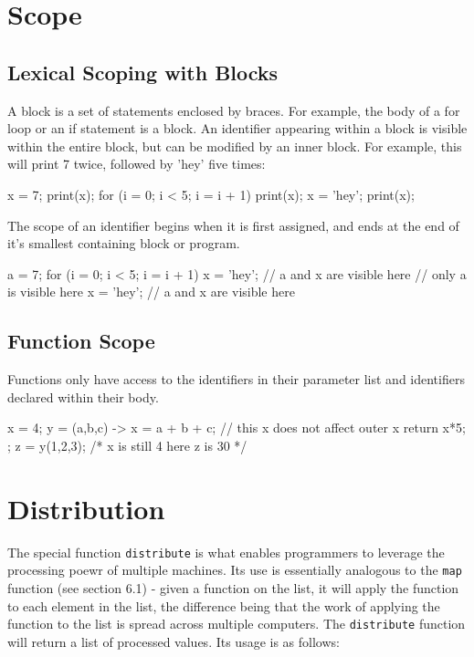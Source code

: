 \documentclass[oneside]{book}
\begin{document}
\section{Scope}

\subsection{Lexical Scoping with Blocks}

A block is a set of statements enclosed by braces. For example, the body of a for loop or an if statement is a block. An identifier appearing within a block is visible within the entire block, but can be modified by an inner block. For example, this will print 7 twice, followed by 'hey' five times:
\begin{mdframed}[hidealllines=true,backgroundcolor=gray!10,skipbelow=.5em,skipabove=.5em]
\begin{code}
x = 7;
print(x);
for (i = 0; i < 5; i = i + 1)
{
  print(x);
  x = 'hey';
}
print(x);
\end{code}
\end{mdframed}
The scope of an identifier begins when it is first assigned, and ends at the end of it's smallest containing block or program.
\begin{mdframed}[hidealllines=true,backgroundcolor=gray!10,skipbelow=.5em,skipabove=.5em]
\begin{code}
a = 7;
for (i = 0; i < 5; i = i + 1)
{
  x = 'hey';
  // a and x are visible here
}
// only a is visible here
x = 'hey';
// a and x are visible here
\end{code}
\end{mdframed}

\subsection{Function Scope}

Functions only have access to the identifiers in their parameter list and identifiers declared within their body.
\begin{mdframed}
[hidealllines=true,backgroundcolor=gray!10,skipbelow=.5em,skipabove=.5em]
\begin{code}
x = 4;
y = (a,b,c) -> 
{
  x = a + b + c; // this x does not affect outer x
  return x*5;
};
z = y(1,2,3);
/* 
  x is still 4 here
  z is 30
*/
\end{code}
\end{mdframed}

\section{Distribution}
The special function \texttt{distribute} is what enables programmers to leverage the processing poewr of multiple machines. Its use is essentially analogous to the \texttt{map} function (see section 6.1) - given a function on the list, it will apply the function to each element in the list, the difference being that the work of applying the function to the list is spread across multiple computers. The  \texttt{distribute} function will return a list of processed values. Its usage is as follows:
\end{document}

